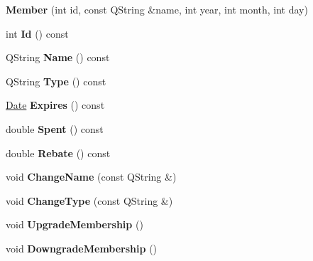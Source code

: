 \begin{DoxyCompactItemize}
\item 
{\bfseries Member} (int id, const Q\+String \&name, int year, int month, int day)\hypertarget{class_member_ae4ac2cc51689e1c0fc3aba138b90431e}{}\label{class_member_ae4ac2cc51689e1c0fc3aba138b90431e}

\item 
int {\bfseries Id} () const \hypertarget{class_member_ade792a4814b246281de4fe2a5017e5d6}{}\label{class_member_ade792a4814b246281de4fe2a5017e5d6}

\item 
Q\+String {\bfseries Name} () const \hypertarget{class_member_a5bac99875876ae00c127d47aa69370ff}{}\label{class_member_a5bac99875876ae00c127d47aa69370ff}

\item 
Q\+String {\bfseries Type} () const \hypertarget{class_member_a5a24f1d4b4db3844f679feade0a0def6}{}\label{class_member_a5a24f1d4b4db3844f679feade0a0def6}

\item 
\hyperlink{class_date}{Date} {\bfseries Expires} () const \hypertarget{class_member_a38d327ef94499ef08c51b8a4791d6974}{}\label{class_member_a38d327ef94499ef08c51b8a4791d6974}

\item 
double {\bfseries Spent} () const \hypertarget{class_member_aa34e695e052dbdaf47f39388d524b9ee}{}\label{class_member_aa34e695e052dbdaf47f39388d524b9ee}

\item 
double {\bfseries Rebate} () const \hypertarget{class_member_ab6a428e16603847fb696a9a5c90f9143}{}\label{class_member_ab6a428e16603847fb696a9a5c90f9143}

\item 
void {\bfseries Change\+Name} (const Q\+String \&)\hypertarget{class_member_a1003f8aaaf3d11141a642fe3a330527d}{}\label{class_member_a1003f8aaaf3d11141a642fe3a330527d}

\item 
void {\bfseries Change\+Type} (const Q\+String \&)\hypertarget{class_member_a3efb5ceeba5d0af2da1ace12a0626493}{}\label{class_member_a3efb5ceeba5d0af2da1ace12a0626493}

\item 
void {\bfseries Upgrade\+Membership} ()\hypertarget{class_member_a835b9172cfe0a9ab0ad23c8843175562}{}\label{class_member_a835b9172cfe0a9ab0ad23c8843175562}

\item 
void {\bfseries Downgrade\+Membership} ()\hypertarget{class_member_a87fe6a012352d66c332c8a4f36c58c0c}{}\label{class_member_a87fe6a012352d66c332c8a4f36c58c0c}


\end{DoxyCompactItemize}

